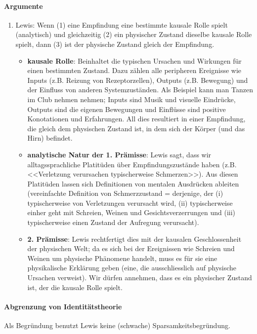\documentclass[../main.tex]{subfiles}
\begin{document}
\paragraph{Argumente}
\begin{enumerate}
	\item Lewis: Wenn (1) eine Empfindung eine bestimmte kausale Rolle spielt (analytisch) und gleichzeitig (2) ein physischer Zustand dieselbe kausale Rolle spielt, dann (3) ist der physische Zustand gleich der Empfindung.
		\begin{itemize}
			\item \textbf{kausale Rolle}: Beinhaltet die typischen Ursachen und Wirkungen für einen bestimmten Zustand. Dazu zählen alle peripheren Ereignisse wie Inputs (z.B. Reizung von Rezeptorzellen), Outputs (z.B. Bewegung) und der Einfluss von anderen Systemzuständen. Als Beispiel kann man Tanzen im Club nehmen nehmen; Inputs sind Musik und visuelle Eindrücke, Outputs sind die eigenen Bewegungen und Einflüsse sind positive Konotationen und Erfahrungen. All dies resultiert in einer Empfindung, die gleich dem physischen Zustand ist, in dem sich der Körper (und das Hirn) befindet.
			\item \textbf{analytische Natur der 1. Prämisse}: Lewis sagt, dass wir alltagssprachliche Platitüden über Empfindungszustände haben (z.B. <<Verletzung verursachen typischerweise Schmerzen>>). Aus diesen Platitüden lassen sich Definitionen von mentalen Ausdrücken ableiten (vereinfachte Definition von Schmerzzustand = derjenige, der (i) typischerweise von Verletzungen verursacht wird, (ii) typischerweise einher geht mit Schreien, Weinen und Gesichtsverzerrungen und (iii) typischerweise einen Zustand der Aufregung verursacht).
			\item \textbf{2. Prämisse}: Lewis rechtfertigt dies mit der kausalen Geschlossenheit der physischen Welt; da es sich bei der Ereignissen wie Schreien und Weinen um physische Phänomene handelt, muss es für sie eine physikalische Erklärung geben (eine, die ausschliesslich auf physische Ursachen verweist). Wir dürfen annehmen, dass es ein physischer Zustand ist, der die kausale Rolle spielt. 
		\end{itemize}
\end{enumerate}
\paragraph{Abgrenzung von Identitätstheorie} Als Begründung benutzt Lewis keine (schwache) Sparsamkeitsbegründung. 
\end{document}
